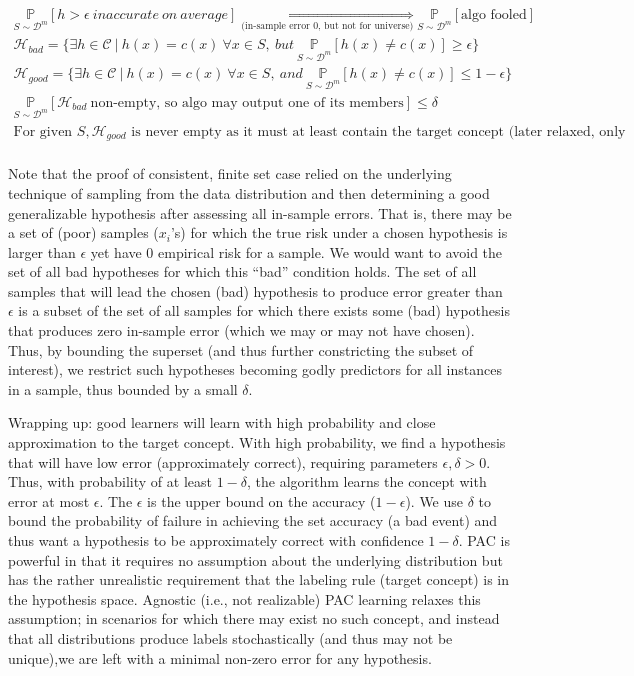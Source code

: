 \begin{gather*}
	\underset{S \sim \mathcal{D}^m}{\mathbb{P}}[h >
		\epsilon~inaccurate~on~average] \underset{\text{(in-sample
			error 0, but not for
			universe)}}{\iff} \underset{S \sim
		\mathcal{D}^m}{\mathbb{P}}[\text{algo
			fooled}]\\
	\mathcal{H}_{bad} = \{\exists h \in \mathcal{C} ~|~ h(x) = c(x)
	~\forall x \in S,~but~\underset{S \sim \mathcal{D}^m}{\mathbb{P}}[h(x)
		\neq
		c(x) ] \geq \epsilon\}\\
	\mathcal{H}_{good} = \{\exists h \in \mathcal{C} ~|~ h(x) = c(x)
	~\forall x \in S,~and~\underset{S \sim \mathcal{D}^m}{\mathbb{P}}[h(x)
		\neq
		c(x) ] \leq 1-\epsilon\}\\
	\underset{S \sim \mathcal{D}^m}{\mathbb{P}}[\mathcal{H}_{bad}
		~\text{non-empty, so algo may output one of its members}] \leq
	\delta\\
	\text{For given $S, \mathcal{H}_{good}$ is never empty as it must at
		least contain the target concept (later relaxed, only for
		``realizable''
		version)}\\
\end{gather*}

Note that the proof of consistent, finite set case relied on the underlying
technique of sampling from the
data distribution and then determining a good generalizable hypothesis after
assessing all in-sample errors. That is,
there may be a set of (poor) samples ($x_i$'s) for which the true risk under a
chosen hypothesis is larger than $\epsilon$ yet have 0 empirical risk for a
sample. We would want to avoid the set of
all bad hypotheses
for which this ``bad'' condition holds. The set of all
samples that will lead the
chosen (bad) hypothesis to produce error greater than $\epsilon$ is a subset of
the set of all samples for which there exists some (bad) hypothesis that
produces zero in-sample error (which we may or may not have chosen). Thus, by
bounding the
superset (and thus further constricting the subset of interest), we restrict
such hypotheses becoming godly predictors for all instances in a sample, thus
bounded by a small $\delta$.\par
Wrapping up: good learners will learn with high probability and close
approximation to the
target concept. With high probability, we find a hypothesis that will have low
error (approximately correct), requiring parameters $\epsilon, \delta > 0$.
Thus, with probability of at least $1-\delta$, the algorithm learns the concept
with error at most $\epsilon$. The $\epsilon$ is the upper bound on the
accuracy ($1-\epsilon$). We use $\delta$ to bound the probability of failure in
achieving the set accuracy (a bad event) and thus want a hypothesis to be
approximately correct with confidence $1-\delta$. PAC is powerful in that it
requires no assumption about
the underlying distribution but has the rather unrealistic requirement that the
labeling rule (target concept)
is in the hypothesis space. Agnostic (i.e., not realizable) PAC learning
relaxes this assumption; in scenarios for which there may exist no such
concept,
and instead that all distributions produce labels stochastically (and thus may
not be unique),we are left with a minimal non-zero
error for any hypothesis.\par

